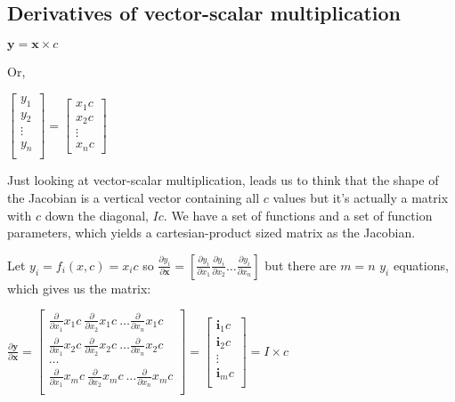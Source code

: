\documentclass[11pt]{article}
\begin{document}
\subsection{Derivatives of vector-scalar multiplication}

$\mathbf{y} = \mathbf{x} \times c$

Or,

$\begin{bmatrix}
           y_1\\
           y_2\\
           \vdots \\
           y_n\\
           \end{bmatrix} = \begin{bmatrix}
		   
           x_{1} c\\
           x_{2} c\\
           \vdots \\
           x_{n} c
         \end{bmatrix}$

Just looking at vector-scalar multiplication, leads us to think that the shape of the Jacobian is a vertical vector containing all $c$ values but it's actually a matrix with $c$ down the diagonal, $I c$. We have a set of functions and a set of function parameters, which yields a cartesian-product sized matrix as the Jacobian.

Let $y_i = f_i(x,c) = x_i c$ so $\frac{\partial y_i}{\partial {\mathbf{x}}} = [ \frac{\partial y_i}{\partial x_1} \frac{\partial y_i}{\partial x_2} \ldots \frac{\partial y_i}{\partial x_n} ]$ but there are $m=n$ $y_i$ equations,  which gives us the matrix:

$\frac{\partial \mathbf{y}}{\partial \mathbf{x}} =  \begin{bmatrix}
\frac{\partial}{\partial {x_1}} x_1 c~ \frac{\partial}{\partial {x_2}} x_1 c~ \ldots \frac{\partial}{\partial {x_n}} x_1 c \\
\frac{\partial}{\partial {x_1}} x_2 c~\frac{\partial}{\partial {x_2}} x_2 c~ \ldots \frac{\partial}{\partial {x_n}} x_2 c \\
\ldots\\
\frac{\partial}{\partial {x_1}} x_m c~ \frac{\partial}{\partial {x_2}} x_m c~ \ldots \frac{\partial}{\partial {x_n}} x_m c\\
\end{bmatrix} = \begin{bmatrix}
           \mathbf{i}_1 c\\
           \mathbf{i}_2 c\\
           \vdots \\
           \mathbf{i}_m c\\
           \end{bmatrix} = I \times c$
\end{document}
